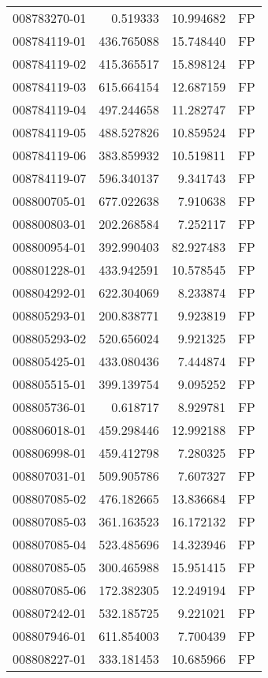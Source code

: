\begin{tabular}{lrrl}
008783270-01 &    0.519333 &    10.994682 &   FP \\
008784119-01 &  436.765088 &    15.748440 &   FP \\
008784119-02 &  415.365517 &    15.898124 &   FP \\
008784119-03 &  615.664154 &    12.687159 &   FP \\
008784119-04 &  497.244658 &    11.282747 &   FP \\
008784119-05 &  488.527826 &    10.859524 &   FP \\
008784119-06 &  383.859932 &    10.519811 &   FP \\
008784119-07 &  596.340137 &     9.341743 &   FP \\
008800705-01 &  677.022638 &     7.910638 &   FP \\
008800803-01 &  202.268584 &     7.252117 &   FP \\
008800954-01 &  392.990403 &    82.927483 &   FP \\
008801228-01 &  433.942591 &    10.578545 &   FP \\
008804292-01 &  622.304069 &     8.233874 &   FP \\
008805293-01 &  200.838771 &     9.923819 &   FP \\
008805293-02 &  520.656024 &     9.921325 &   FP \\
008805425-01 &  433.080436 &     7.444874 &   FP \\
008805515-01 &  399.139754 &     9.095252 &   FP \\
008805736-01 &    0.618717 &     8.929781 &   FP \\
008806018-01 &  459.298446 &    12.992188 &   FP \\
008806998-01 &  459.412798 &     7.280325 &   FP \\
008807031-01 &  509.905786 &     7.607327 &   FP \\
008807085-02 &  476.182665 &    13.836684 &   FP \\
008807085-03 &  361.163523 &    16.172132 &   FP \\
008807085-04 &  523.485696 &    14.323946 &   FP \\
008807085-05 &  300.465988 &    15.951415 &   FP \\
008807085-06 &  172.382305 &    12.249194 &   FP \\
008807242-01 &  532.185725 &     9.221021 &   FP \\
008807946-01 &  611.854003 &     7.700439 &   FP \\
008808227-01 &  333.181453 &    10.685966 &   FP \\

\end{tabular}

